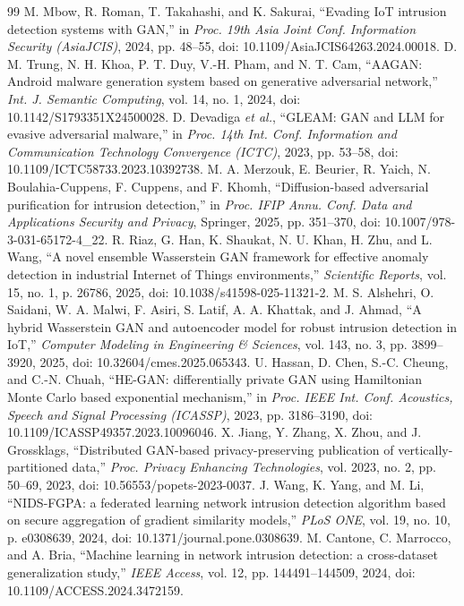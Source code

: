 \documentclass{iaesarticle}
\begin{document}
\begin{thebibliography}{99}
 M. Mbow, R. Roman, T. Takahashi, and K. Sakurai, ``Evading IoT intrusion detection systems with GAN,'' in \textsl{Proc. 19th Asia Joint Conf. Information Security (AsiaJCIS)}, 2024, pp. 48--55, doi: 10.1109/AsiaJCIS64263.2024.00018.
 D. M. Trung, N. H. Khoa, P. T. Duy, V.-H. Pham, and N. T. Cam, ``AAGAN: Android malware generation system based on generative adversarial network,'' \textsl{Int. J. Semantic Computing}, vol. 14, no. 1, 2024, doi: 10.1142/S1793351X24500028.
 D. Devadiga \textsl{et al.}, ``GLEAM: GAN and LLM for evasive adversarial malware,'' in \textsl{Proc. 14th Int. Conf. Information and Communication Technology Convergence (ICTC)}, 2023, pp. 53--58, doi: 10.1109/ICTC58733.2023.10392738.
 M. A. Merzouk, E. Beurier, R. Yaich, N. Boulahia-Cuppens, F. Cuppens, and F. Khomh, ``Diffusion-based adversarial purification for intrusion detection,'' in \textsl{Proc. IFIP Annu. Conf. Data and Applications Security and Privacy}, Springer, 2025, pp. 351--370, doi: 10.1007/978-3-031-65172-4\_22.
 R. Riaz, G. Han, K. Shaukat, N. U. Khan, H. Zhu, and L. Wang, ``A novel ensemble Wasserstein GAN framework for effective anomaly detection in industrial Internet of Things environments,'' \textsl{Scientific Reports}, vol. 15, no. 1, p. 26786, 2025, doi: 10.1038/s41598-025-11321-2.
 M. S. Alshehri, O. Saidani, W. A. Malwi, F. Asiri, S. Latif, A. A. Khattak, and J. Ahmad, ``A hybrid Wasserstein GAN and autoencoder model for robust intrusion detection in IoT,'' \textsl{Computer Modeling in Engineering \& Sciences}, vol. 143, no. 3, pp. 3899--3920, 2025, doi: 10.32604/cmes.2025.065343.
 U. Hassan, D. Chen, S.-C. Cheung, and C.-N. Chuah, ``HE-GAN: differentially private GAN using Hamiltonian Monte Carlo based exponential mechanism,'' in \textsl{Proc. IEEE Int. Conf. Acoustics, Speech and Signal Processing (ICASSP)}, 2023, pp. 3186--3190, doi: 10.1109/ICASSP49357.2023.10096046.
 X. Jiang, Y. Zhang, X. Zhou, and J. Grossklags, ``Distributed GAN-based privacy-preserving publication of vertically-partitioned data,'' \textsl{Proc. Privacy Enhancing Technologies}, vol. 2023, no. 2, pp. 50--69, 2023, doi: 10.56553/popets-2023-0037.
 J. Wang, K. Yang, and M. Li, ``NIDS-FGPA: a federated learning network intrusion detection algorithm based on secure aggregation of gradient similarity models,'' \textsl{PLoS ONE}, vol. 19, no. 10, p. e0308639, 2024, doi: 10.1371/journal.pone.0308639.
 M. Cantone, C. Marrocco, and A. Bria, ``Machine learning in network intrusion detection: a cross-dataset generalization study,'' \textsl{IEEE Access}, vol. 12, pp. 144491--144509, 2024, doi: 10.1109/ACCESS.2024.3472159.

\end{thebibliography}
\end{document}
